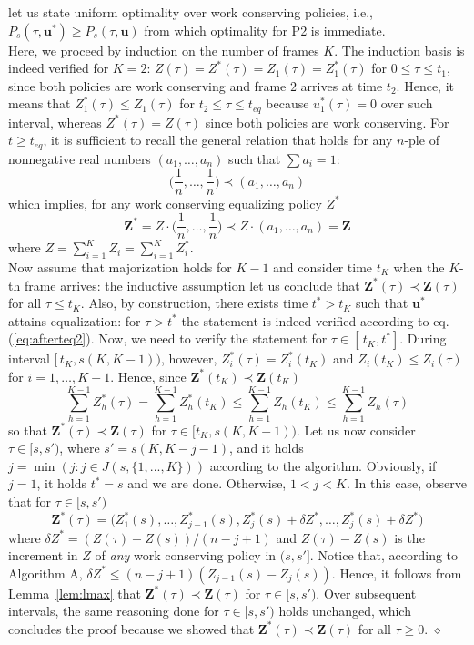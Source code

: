\documentclass[10pt,twocolumn,conference,final]{IEEEtran}
\def\endpf{\hfill$\diamond$}
\newcommand{\Z}{\mathbf Z}
\begin{document}
let us state uniform optimality over work conserving policies, i.e., 
$P_s( \tau , {\mathbf u^*} ) \geq P_s(\tau ,{\mathbf u})$ from which 
optimality for P2 is immediate.\\
Here, we proceed by induction on the number of frames $K$. The induction 
basis is indeed verified for $K=2$: $Z(\tau)=Z^*(\tau)=Z_1(\tau)=Z_1^*(\tau)$ for 
 $0\leq \tau \leq t_1$, since both policies are work conserving and 
frame $2$ arrives at time $t_2$. Hence, it means that $Z_1^*(\tau)\leq Z_1(\tau)$
 for $t_2\leq \tau \leq t_{eq}$ because $u_1^*(\tau)=0$ over such interval, 
whereas $Z^*(\tau)=Z(\tau)$ since both policies are work conserving. 
For $t \geq t_{eq}$, it is sufficient to recall the general relation 
\cite[pp. 7]{Marshall} that holds for any $n$-ple of nonnegative real 
numbers $(a_1,\ldots,a_n)$ such that $\sum a_i=1$:
\begin{equation}\label{eq:afterteq}
\Big(\frac 1n,\ldots,\frac 1n\Big) \prec (a_1,\ldots,a_n)\nonumber
\end{equation}
which implies, for any work conserving equalizing policy $Z^*$ 
\begin{equation}\label{eq:afterteq2}
\Z^* = Z \cdot \Big(\frac 1n,\ldots,\frac 1n\Big) \prec Z \cdot (a_1,\ldots,a_n)=\Z 
\end{equation}
where $Z=\sum_{i=1}^K Z_i=\sum_{i=1}^K Z_i^*$. \\
Now assume that majorization holds for $K-1$ and consider time $t_K$ when 
the $K$-th frame arrives: the inductive assumption let us conclude that 
$\Z^*(\tau) \prec \Z (\tau)$ for all $\tau\leq t_K$. Also, by construction, 
there exists time $t^*>t_K$ such that $\mathbf u^*$ attains equalization: for
$\tau> t^*$ the statement is indeed verified according to eq. (\ref{eq:afterteq2}).
Now, we need to verify the statement for $\tau \in [\,t_K,t^*]$. During interval 
$[\,t_K,s(K,K-1))$, however, $Z_i^*(\tau)=Z_i^*(t_K)$ and  $Z_i(t_K)\leq Z_i(\tau)$ for 
$i=1,\ldots,K-1$. Hence, since $\Z^*(t_K)\prec \Z(t_K)$
\[
\sum_{h=1}^{K-1}Z_h^*(\tau)=\sum_{h=1}^{K-1}Z_h^*(t_K) \leq \sum_{h=1}^{K-1}Z_h(t_{K})\leq\sum_{h=1}^{K-1}Z_h(\tau)
\]
so that $\Z^*(\tau)\prec \Z(\tau)$ for $\tau \in [t_K,s(K,K-1))$. Let 
us now consider $\tau \in [s,s')$, where $s'=s(K,K-j-1)$, and it holds $j=\min(j: j\in J(s,\{1,...,K\}))$
 according to the algorithm. Obviously, if $j=1$, it holds $t^*=s$ and we are done. Otherwise, $1<j<K$. In this case, 
observe that for $\tau \in [s,s')$  
\[
\Z^*(\tau)=\Big (Z_1^*(s),\ldots,Z_{j-1}^*(s),Z_{j}^*(s)+\delta Z^*,\ldots,Z_{j}^*(s)+\delta Z^*\Big )
\]
where $\delta Z^*=(Z(\tau)-Z(s))/(n-j+1)$ and $Z(\tau)-Z(s)$ is the increment in $Z$ of {\em any} 
work conserving policy in $(s,s']$. Notice that, according to Algorithm A, $\delta Z^* \leq (n-j+1)(Z_{j-1}(s) - Z_{j}(s))$. Hence, it follows from Lemma~\ref{lem:lmax} that $\Z^*(\tau)\prec \Z(\tau)$ for $\tau \in [s,s')$. 
Over subsequent intervals, the same reasoning done for $\tau \in [s,s')$ holds unchanged, which concludes
  the proof because we showed that $\Z^*(\tau) \prec \Z(\tau)$ for all $\tau \geq 0$.
\endpf
\end{document}

